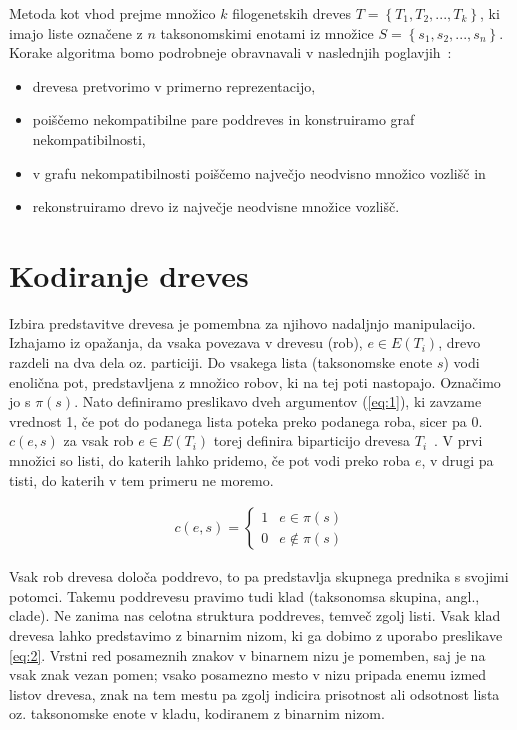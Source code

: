 \documentclass[a4paper, 12pt]{book}
\begin{document}
Metoda kot vhod prejme množico $k$ filogenetskih dreves 
$T = \left\{ {T_1, T_2, ..., T_k} \right\}$, ki imajo liste označene z $n$ 
taksonomskimi enotami iz množice $S = \left\{ {s_1, s_2, ..., s_n} \right\}$. 
Korake algoritma bomo podrobneje obravnavali
 v naslednjih poglavjih~\cite{pw}:
\begin{itemize}
	\item drevesa pretvorimo v primerno reprezentacijo,
	\item poiščemo nekompatibilne pare poddreves in konstruiramo graf nekompatibilnosti,
	\item v grafu nekompatibilnosti poiščemo največjo neodvisno množico vozlišč in
	\item rekonstruiramo drevo iz največje neodvisne množice vozlišč.
\end{itemize}

\section{Kodiranje dreves}
Izbira predstavitve drevesa je pomembna za njihovo nadaljnjo manipulacijo. Izhajamo iz 
opažanja, da vsaka povezava v drevesu (rob), $e \in E(T_i)$, drevo razdeli na dva dela oz. particiji.
Do vsakega lista (taksonomske enote $s$) vodi enolična pot, predstavljena z množico 
robov, ki na tej poti nastopajo. Označimo jo s $\pi(s)$. Nato definiramo preslikavo 
dveh argumentov (\ref{eq:1}), ki zavzame vrednost 1, če pot do podanega lista 
poteka preko podanega roba, sicer pa 0. $c(e, s)$ za vsak rob $e \in E(T_i)$ torej 
definira biparticijo drevesa $T_i$~\cite{pw}. V prvi množici so listi, do katerih 
lahko pridemo, če pot vodi preko roba $e$, v drugi pa tisti, do katerih v tem 
primeru ne moremo.

\begin{align}
	c(e, s) = 
	\left\{
		\begin{array}{ll}
			1 & e \in \pi(s) \\
			0 & e \notin \pi(s)
		\end{array}
	\right.
	\label{eq:1}
\end{align}

\noindent Vsak rob drevesa določa poddrevo, to pa predstavlja skupnega prednika s svojimi 
potomci. Takemu poddrevesu pravimo tudi klad (taksonomsa skupina, angl., clade). Ne zanima nas
celotna struktura poddreves, temveč zgolj listi. Vsak klad drevesa lahko 
predstavimo z binarnim nizom, ki ga dobimo z uporabo preslikave \ref{eq:2}.
Vrstni red posameznih znakov v binarnem nizu je
pomemben, saj je na vsak znak vezan pomen; vsako posamezno mesto v nizu pripada 
enemu izmed listov drevesa, znak na tem mestu pa zgolj indicira prisotnost ali
odsotnost lista oz. taksonomske enote v kladu, kodiranem z binarnim nizom.
\end{document}
